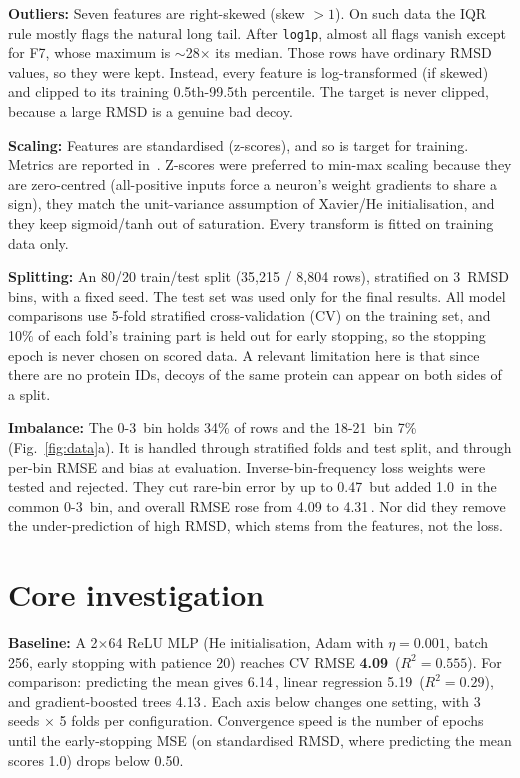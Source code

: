 \documentclass[10pt,a4paper]{article}
\newcommand{\A}{\,\text{\AA}}
\begin{document}
\textbf{Outliers:} Seven features are right-skewed (skew $>1$). On such data the IQR rule mostly flags
the natural long tail. After \texttt{log1p}, almost all flags vanish except for F7, whose maximum is
$\sim$28$\times$ its median. Those rows have ordinary RMSD values, so they were kept. Instead, every
feature is log-transformed (if skewed) and clipped to its training 0.5th-99.5th percentile. The
target is never clipped, because a large RMSD is a genuine bad decoy.

\textbf{Scaling:} Features are standardised (z-scores), and so is target for training. Metrics are
reported in \A. Z-scores were preferred to min-max scaling because they are zero-centred (all-positive
inputs force a neuron's weight gradients to share a sign), they match the unit-variance assumption of
Xavier/He initialisation, and they keep sigmoid/tanh out of saturation. Every transform is fitted on
training data only.

\textbf{Splitting:} An 80/20 train/test split (35{,}215 / 8{,}804 rows), stratified on 3\A{} RMSD
bins, with a fixed seed. The test set was used only for the final results. All model comparisons use
5-fold stratified cross-validation (CV) on the training set, and 10\% of each fold's training part is held out for
early stopping, so the stopping epoch is never chosen on scored data. A relevant limitation here is that since there are no protein IDs,
decoys of the same protein can appear on both sides of a split.

\textbf{Imbalance:} The 0-3\A{} bin holds 34\% of rows and the 18-21\A{} bin 7\% (Fig.~\ref{fig:data}a).
It is handled through stratified folds and test split, and through per-bin RMSE and bias at evaluation.
Inverse-bin-frequency loss weights were tested and rejected. They cut rare-bin error by up to 0.47\A{} but
added 1.0\A{} in the common 0-3\A{} bin, and overall RMSE rose from 4.09 to 4.31\A. Nor did they remove the
under-prediction of high RMSD, which stems from the features, not the loss.

\section{Core investigation}
\textbf{Baseline:} A 2$\times$64 ReLU MLP (He initialisation, Adam with $\eta=0.001$, batch 256, early stopping with patience 20)
reaches CV RMSE \textbf{4.09\A} ($R^2=0.555$). For comparison: predicting the mean gives 6.14\A, linear regression 5.19\A{}
($R^2=0.29$), and gradient-boosted trees 4.13\A. Each axis below changes one setting, with 3 seeds $\times$ 5
folds per configuration. Convergence speed is the number of epochs until the early-stopping MSE
(on standardised RMSD, where predicting the mean scores 1.0) drops below 0.50.
\end{document}
